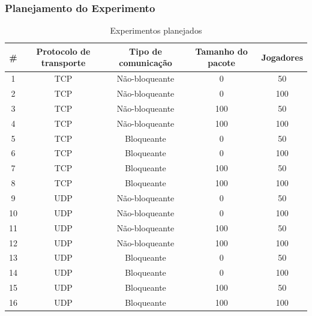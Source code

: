 \documentclass{beamer}
\begin{document}
\begin{frame} \frametitle{Planejamento do Experimento}
\begin{table}
  \center
  \tiny
  \begin{tabular}{|c|c|c|c|c|}
  \hline
    \#  & \textbf{Protocolo de transporte} & \textbf{Tipo de comunicação} & \textbf{Tamanho do pacote} & \textbf{Jogadores} \\ \hline
    1 & TCP & Não-bloqueante & 0 & 50 \\ \hline
    2 & TCP & Não-bloqueante & 0 & 100 \\ \hline
    3 & TCP & Não-bloqueante & 100 & 50 \\ \hline
    4 & TCP & Não-bloqueante & 100 & 100 \\ \hline
    5 & TCP & Bloqueante & 0 & 50 \\ \hline
    6 & TCP & Bloqueante & 0 & 100 \\ \hline
    7 & TCP & Bloqueante & 100 & 50 \\ \hline
    8 & TCP & Bloqueante & 100 & 100 \\ \hline
    9 & UDP & Não-bloqueante & 0 & 50 \\ \hline
    10 & UDP & Não-bloqueante & 0 & 100 \\ \hline
    11 & UDP & Não-bloqueante & 100 & 50 \\ \hline
    12 & UDP & Não-bloqueante & 100 & 100 \\ \hline
    13 & UDP & Bloqueante & 0 & 50 \\ \hline
    14 & UDP & Bloqueante & 0 & 100 \\ \hline
    15 & UDP & Bloqueante & 100 & 50 \\ \hline
    16 & UDP & Bloqueante & 100 & 100 \\ \hline
  \end{tabular} 
\caption{Experimentos planejados}
\label{tab:experimentos}
\end{table} 	
\end{frame}
\end{document}
